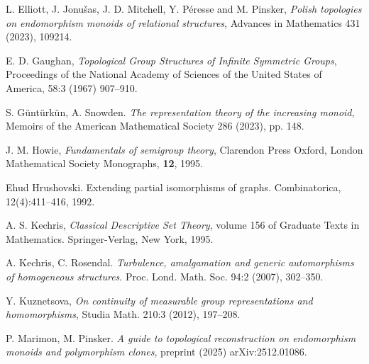 \documentclass[11pt]{amsart}
\theoremstyle{definition}
\begin{document}
\begin{thebibliography}{}
L. Elliott, J. Jonu\v{s}as, J. D. Mitchell, Y. P\'eresse and M. Pinsker, {\em Polish topologies on endomorphism monoids of relational structures}, Advances in Mathematics 431 (2023), 109214.

E. D. Gaughan, {\em Topological Group Structures of Infinite Symmetric Groups},
Proceedings of the National Academy of Sciences of the United States of America,
58:3 (1967) 907--910.


S. Güntürkün, A. Snowden. {\em The representation theory of the increasing monoid}, Memoirs of the American Mathematical Society 286 (2023), pp. 148.


J. M. Howie, {\em Fundamentals of semigroup theory}, 
Clarendon Press Oxford, 
London Mathematical Society Monographs, {\bf 12}, 1995.

Ehud Hrushovski. Extending partial isomorphisms of graphs. Combinatorica, 12(4):411–416, 1992.

  A. S. Kechris,
  {\em Classical Descriptive Set Theory}, volume 156 of Graduate Texts in Mathematics. Springer-Verlag, New York, 1995.

A. Kechris, C. Rosendal. {\em Turbulence, amalgamation and generic automorphisms
of homogeneous structures}. Proc. Lond. Math. Soc. 94:2 (2007), 302--350.



Y. Kuznetsova, {\em On continuity of measurable group representations and homomorphisms}, Studia Math. 210:3 (2012), 197--208.





P. Marimon, M. Pinsker. {\em A guide to topological reconstruction on endomorphism monoids and polymorphism clones}, preprint (2025) arXiv:2512.01086.
 

\end{thebibliography}
\end{document}
